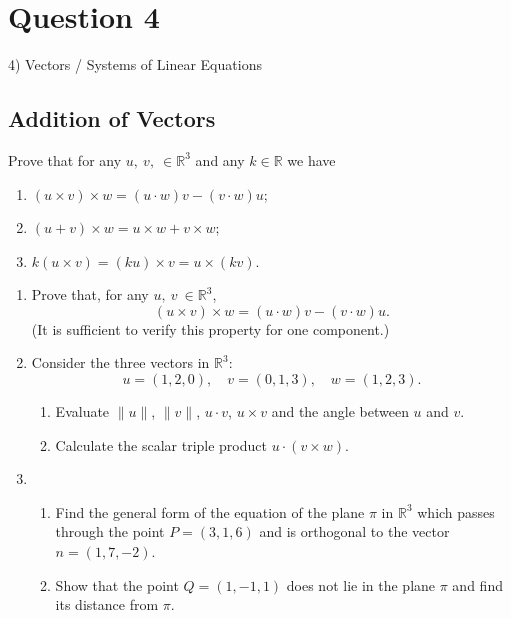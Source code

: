 \documentclass[12pt,a4paper]{article}
\begin{document}
	\section*{Question 4}
	4) Vectors / Systems of Linear Equations
	
	\subsection*{Addition of Vectors}
Prove that for any $u,\:v,\:\in\mathbb{R}^3$
and any $k\in\mathbb{R}$ we have
\begin{enumerate}
	
	\item $(u\times v)\times w= (u\cdot w)v - (v\cdot w)u$;
	
	\item $(u+v)\times w=u\times w + v\times w$;
	
	\item $k(u\times v)=(ku)\times v = u\times (kv)$.
\end{enumerate}

\begin{enumerate}
	\item Prove that, for any $u,\:v\:\in\mathbb{R}^3$, %
	$$(u\times v)\times w= (u\cdot w)v - (v\cdot w)u.$$
	(It is sufficient to verify this property for one component.)
	\item
	Consider the three vectors in $\mathbb{R}^3$:
	$$
	u = (1, 2, 0), \quad v = (0, 1, 3),\quad w = (1, 2, 3).
	$$
	\begin{enumerate}
		\item  Evaluate $\|u\|$, $\|v\|$, $u\cdot v$, $u\times v$ and the angle between $u$ and $v$. %
		
		\medskip\item Calculate the scalar triple product  $u\cdot(v \times w)$. %
	\end{enumerate}
	\item 
	\begin{enumerate}
		\item Find the general form of the equation of the plane $\pi$ in $\mathbb{R}^3$ which passes through the point 
		$P=(3,1,6)$ and is orthogonal to the vector $n=(1,7,-2)$. %
		
		\item Show that the point $Q=(1,-1,1)$ does not lie in the plane $\pi$ and find its distance from $\pi$. %
	\end{enumerate}
\end{enumerate}
\end{document}
